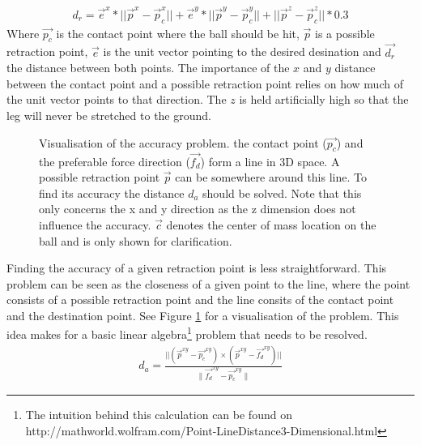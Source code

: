 \documentclass[a4paper]{article}
\begin{document}
\begin{align}
    d_r = \vec{e}^{x} * || \vec{p}^{x} -\vec{p}_{c}^{x}|| + \vec{e}^y *
||\vec{p}^{y} - \vec{p}_{c}^y|| +  ||
\vec{p}^z - \vec{p}_{c}^z|| * 0.3
\label{eq:distance}
\end{align}
Where $\vec{p_c}$ is the contact point where the ball should be hit,
$\vec{p}$ is a possible retraction point, $\vec{e}$ is the unit vector pointing
to the desired desination and $\vec{d_r}$ the distance between both
points. The importance of the $x$ and $y$ distance between the contact point and a possible
retraction point relies on how much of the unit vector points to that direction.
The $z$ is held artificially high so that the leg will never be stretched to the
ground.

\begin{figure}
  \resizebox{\textwidth}{!} {
    }
    \caption{Visualisation of the accuracy problem. \small{the contact point
            ($\vec{p_c}$) and the preferable force direction ($\vec{f_d}$) form a line
    in 3D space. A possible retraction point $\vec{p}$ can be somewhere around
    this line. To find its accuracy the distance $d_a$ should be solved. Note that
    this only concerns the x and y direction as the z dimension does not
    influence the accuracy. $\vec{c}$ denotes the center of mass
    location on the ball and is only shown for clarification.}}
    \label{fig:accuracy}
\end{figure}    

Finding the accuracy of a given retraction point is less straightforward. This
problem can be seen as the closeness of a given point to the line, where the
point consists of a possible retraction point and the line consits of the
contact point and the destination point. See Figure \ref{fig:accuracy} for a
visualisation of the problem. This idea makes for a basic linear algebra\footnote{The intuition behind this calculation can be found on http://mathworld.wolfram.com/Point-LineDistance3-Dimensional.html }
problem that needs to be resolved.
\begin{align*}
    d_a = \frac{||(\vec{p}^{xy} -\vec{p_c}^{xy}) \times (\vec{p}^{xy} -
    \vec{f_d}^{xy})||}{\|\vec{f_d}^{xy}- \vec{p_c}^{xy}\|}
\end{align*}
\end{document}
